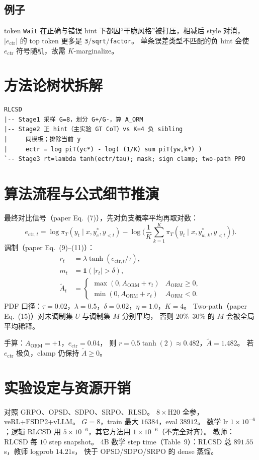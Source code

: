 \documentclass[11pt,a4paper]{ctexart}
\begin{document}
\subsection{例子}
token \texttt{Wait} 在正确与错误 hint 下都因“干脆风格”被打压，相减后 style 对消，
$|e_{\mathrm{ctr}}|$ 的 top token 更多是 \texttt{3}/\texttt{sqrt}/\texttt{factor}。
单条误差类型不匹配的负 hint 会使 $e_{\mathrm{ctr}}$ 符号随机，故需 $K$-marginalize。

\section{方法论树状拆解}
\begin{verbatim}
RLCSD
|-- Stage1 采样 G=8，划分 G+/G-，算 A_ORM
|-- Stage2 正 hint（主实验 GT CoT）vs K=4 负 sibling
|     同模板；排除当前 y
|     ectr = log piT(yc*) - log( (1/K) sum piT(yw,k*) )
`-- Stage3 rt=lambda tanh(ectr/tau); mask; sign clamp; two-path PPO
\end{verbatim}

\section{算法流程与公式细节推演}
最终对比信号（paper Eq.~(7)），先对负支概率平均再取对数：
\begin{equation}
e_{\mathrm{ctr},t}
=\log\pi_T(y_t\mid x,y_c^\ast,y_{<t})
-\log\Big(\frac1K\sum_{k=1}^K\pi_T(y_t\mid x,y_{w,k}^\ast,y_{<t})\Big).
\end{equation}
调制（paper Eq.~(9)--(11)）：
\begin{align}
r_t&=\lambda\tanh(e_{\mathrm{ctr},t}/\tau),\\
m_t&=\mathbf{1}(|r_t|>\delta),\\
\tilde A_t
&=\begin{cases}
\max(0,A_{\mathrm{ORM}}+r_t) & A_{\mathrm{ORM}}\ge 0,\\
\min(0,A_{\mathrm{ORM}}+r_t) & A_{\mathrm{ORM}}<0.
\end{cases}
\end{align}
PDF 口径：$\tau=0.02$，$\lambda=0.5$，$\delta=0.02$，$\eta=1.0$，$K=4$。
Two-path（paper Eq.~(15)）对未调制集 $U$ 与调制集 $M$ 分别平均，
否则 $20\%$--$30\%$ 的 $M$ 会被全局平均稀释。

手算：$A_{\mathrm{ORM}}=+1$，$e_{\mathrm{ctr}}=0.04$，
则 $r=0.5\tanh(2)\approx0.482$，$\tilde A=1.482$。
若 $e_{\mathrm{ctr}}$ 极负，clamp 仍保持 $\tilde A\ge0$。

\section{实验设定与资源开销}
对照 GRPO、OPSD、SDPO、SRPO、RLSD。
$8\times$H20 全参，veRL+FSDP2+vLLM。
$G=8$，train 最大 $16384$，eval $38912$。
数学 lr $1\times10^{-6}$；逻辑 RLCSD 用 $5\times10^{-6}$，其它方法用 $1\times10^{-6}$（不完全对齐）。
教师：RLCSD 每 $10$ step snapshot。
4B 数学 step time（Table~9）：RLCSD 总 $891.55$s，教师 logprob $14.21$s，
快于 OPSD/SDPO/SRPO 的 dense 蒸馏。
\end{document}
